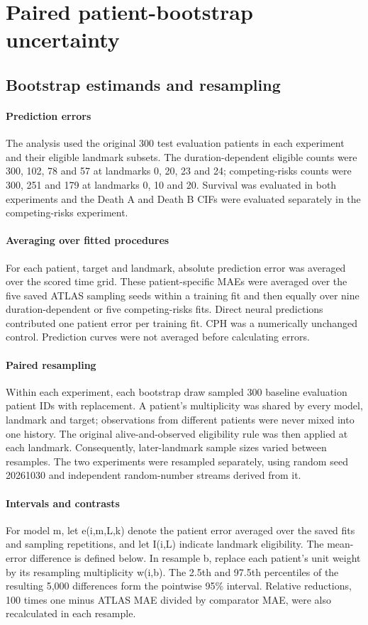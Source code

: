 \section{Paired patient-bootstrap uncertainty}\label{app:patientbootstrap}
\subsection{Bootstrap estimands and resampling}
\paragraph{Prediction errors} The analysis used the original 300 test evaluation patients in each experiment and their eligible landmark subsets. The duration-dependent eligible counts were 300, 102, 78 and 57 at landmarks 0, 20, 23 and 24; competing-risks counts were 300, 251 and 179 at landmarks 0, 10 and 20. Survival was evaluated in both experiments and the Death A and Death B CIFs were evaluated separately in the competing-risks experiment.

\paragraph{Averaging over fitted procedures} For each patient, target and landmark, absolute prediction error was averaged over the scored time grid. These patient-specific MAEs were averaged over the five saved ATLAS sampling seeds within a training fit and then equally over nine duration-dependent or five competing-risks fits. Direct neural predictions contributed one patient error per training fit. CPH was a numerically unchanged control. Prediction curves were not averaged before calculating errors.

\paragraph{Paired resampling} Within each experiment, each bootstrap draw sampled 300 baseline evaluation patient IDs with replacement. A patient's multiplicity was shared by every model, landmark and target; observations from different patients were never mixed into one history. The original alive-and-observed eligibility rule was then applied at each landmark. Consequently, later-landmark sample sizes varied between resamples. The two experiments were resampled separately, using random seed 20261030 and independent random-number streams derived from it.

\paragraph{Intervals and contrasts} For model m, let e(i,m,L,k) denote the patient error averaged over the saved fits and sampling repetitions, and let I(i,L) indicate landmark eligibility. The mean-error difference is defined below. In resample b, replace each patient's unit weight by its resampling multiplicity w(i,b). The 2.5th and 97.5th percentiles of the resulting 5,000 differences form the pointwise 95\% interval. Relative reductions, 100 times one minus ATLAS MAE divided by comparator MAE, were also recalculated in each resample.


